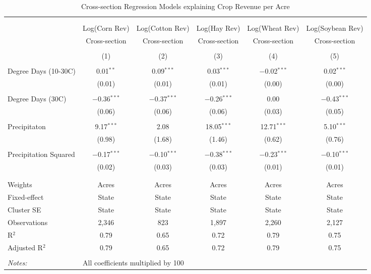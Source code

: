 \documentclass[10pt]{article}
\begin{document}
\begin{table}[!htbp] \centering 
  \caption{Cross-section Regression Models explaining Crop Revenue per Acre} 
  \label{} 
\footnotesize 
\begin{tabular}{@{\extracolsep{5pt}}lccccc} 
\\[-1.8ex]\hline 
\hline \\[-1.8ex] 
\\[-1.8ex] & Log(Corn Rev) & Log(Cotton Rev) & Log(Hay Rev) & Log(Wheat Rev) & Log(Soybean Rev) \\ 
 & Cross-section & Cross-section & Cross-section & Cross-section & Cross-section \\ 
\\[-1.8ex] & (1) & (2) & (3) & (4) & (5)\\ 
\hline \\[-1.8ex] 
 Degree Days (10-30C) & 0.01$^{**}$ & 0.09$^{***}$ & 0.03$^{***}$ & $-$0.02$^{***}$ & 0.02$^{***}$ \\ 
  & (0.01) & (0.01) & (0.01) & (0.00) & (0.00) \\ 
  & & & & & \\ 
 Degree Days (30C) & $-$0.36$^{***}$ & $-$0.37$^{***}$ & $-$0.26$^{***}$ & 0.00 & $-$0.43$^{***}$ \\ 
  & (0.06) & (0.06) & (0.06) & (0.03) & (0.05) \\ 
  & & & & & \\ 
 Precipitaton & 9.17$^{***}$ & 2.08 & 18.05$^{***}$ & 12.71$^{***}$ & 5.10$^{***}$ \\ 
  & (0.98) & (1.68) & (1.46) & (0.62) & (0.76) \\ 
  & & & & & \\ 
 Precipitation Squared & $-$0.17$^{***}$ & $-$0.10$^{***}$ & $-$0.38$^{***}$ & $-$0.23$^{***}$ & $-$0.10$^{***}$ \\ 
  & (0.02) & (0.03) & (0.03) & (0.01) & (0.01) \\ 
  & & & & & \\ 
\hline \\[-1.8ex] 
Weights & Acres & Acres & Acres & Acres & Acres \\ 
Fixed-effect & State & State & State & State & State \\ 
Cluster SE & State & State & State & State & State \\ 
Observations & 2,346 & 823 & 1,897 & 2,260 & 2,127 \\ 
R$^{2}$ & 0.79 & 0.65 & 0.72 & 0.79 & 0.75 \\ 
Adjusted R$^{2}$ & 0.79 & 0.65 & 0.72 & 0.79 & 0.75 \\ 
\hline 
\hline \\[-1.8ex] 
\textit{Notes:} & \multicolumn{5}{l}{All coefficients multiplied by 100} \\ 
\end{tabular} 
\end{table} 
\end{document}
